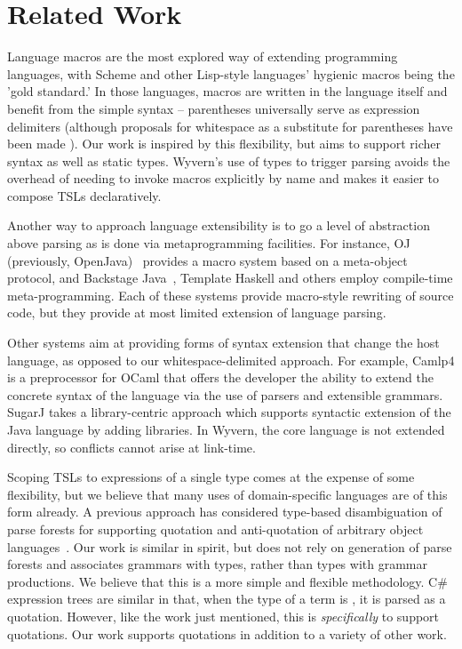 \section{Related Work}
\label{s:related}

Language macros are the most explored way of extending programming languages, with Scheme and other Lisp-style languages' hygienic macros being the 'gold standard.' In those languages, macros are written in the language itself and benefit from the simple syntax -- parentheses universally serve as expression delimiters (although proposals for whitespace as a substitute for parentheses have been made \cite{srfi-49}). Our work is inspired by this flexibility, but aims to support richer syntax as well as static types. Wyvern's use of types to trigger parsing  avoids the overhead of needing to invoke macros explicitly by name and makes it easier to compose TSLs declaratively.

Another way to approach language extensibility is to go a level of abstraction above parsing as is done via metaprogramming facilities. For instance, OJ (previously, OpenJava)~\cite{Tatsubori00openjava:a} provides a macro system based on a meta-object protocol, and Backstage Java~\cite{Palmer:2011:BJM:2048066.2048137}, Template Haskell \cite{sheard2002template} and others employ compile-time meta-programming.  Each of these systems provide macro-style rewriting of source code, but they provide at most limited extension of language parsing.

Other systems aim at providing forms of syntax extension that change the host language, as opposed to our whitespace-delimited approach.  For example, Camlp4 \cite{camlp4} is a preprocessor for OCaml that offers the developer the ability to extend the concrete syntax of the language via the use of parsers and extensible grammars.  SugarJ \cite{Erdweg:2011:SLL:2048147.2048199} takes a library-centric approach which supports syntactic extension of the Java language by adding libraries. In Wyvern, the core language
is not extended directly, so conflicts cannot arise at link-time. 

Scoping TSLs to expressions of a single type comes at the expense of some flexibility, but we believe that many uses of domain-specific languages are of this form already. A previous approach has considered type-based disambiguation of parse forests for supporting quotation and anti-quotation of arbitrary object languages~\cite{bravenboer2005generalized}. Our work is similar in spirit, but does not rely on generation of parse forests and associates grammars with types, rather than types with grammar productions. We believe that this is a more simple and flexible methodology. 
 C\# expression trees \cite{Csharp} are similar in that, when the type of a term is , it is parsed as a quotation. However, like the work just mentioned, this is \emph{specifically} to support quotations. Our work supports quotations in addition to a variety of other work.
 
